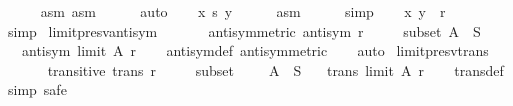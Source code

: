 \begin{isabellebody}
\ \ \ \ \isamarkupfalse%
\ asm{}\ asm{}\isanewline
\ \ \ \ \isamarkupfalse%
\ auto\isanewline
\ \ \isamarkupfalse%
\ {\isachardoublequoteopen}x\ {\isasympreceq}\isactrlsub {\isacharquery}{\kern0pt}s\ y{\isachardoublequoteclose}\isanewline
\ \ \ \ \isamarkupfalse%
\ asm{}\isanewline
\ \ \ \ \isamarkupfalse%
\ simp\isanewline
\ \ \isamarkupfalse%
\ {\isachardoublequoteopen}{\isacharparenleft}{\kern0pt}x{\isacharcomma}{\kern0pt}\ y{\isacharparenright}{\kern0pt}\ {\isasymin}\ r{\isachardoublequoteclose}\isanewline
\ \ \ \ \isamarkupfalse%
\ simp\isanewline
{}\isamarkupfalse%
%
\endisatagproof
{\isafoldproof}%
%
\isadelimproof
\isanewline
%
\endisadelimproof
\isanewline
{}\isamarkupfalse%
\ limit{\isacharunderscore}{\kern0pt}presv{\isacharunderscore}{\kern0pt}antisym{\isacharcolon}{\kern0pt}\isanewline
\ \ \isanewline
\ \ \ \ antisymmetric{\isacharcolon}{\kern0pt}\ {\isachardoublequoteopen}antisym\ r{\isachardoublequoteclose}\ \isanewline
\ \ \ \ subset{\isacharcolon}{\kern0pt}\ {\isachardoublequoteopen}A\ {\isasymsubseteq}\ S{\isachardoublequoteclose}\isanewline
\ \ \ {\isachardoublequoteopen}antisym\ {\isacharparenleft}{\kern0pt}limit\ A\ r{\isacharparenright}{\kern0pt}{\isachardoublequoteclose}\isanewline
%
\isadelimproof
\ \ %
\endisadelimproof
%
\isatagproof
{}\isamarkupfalse%
\ antisym{\isacharunderscore}{\kern0pt}def\ antisymmetric\isanewline
\ \ \isamarkupfalse%
\ auto%
\endisatagproof
{\isafoldproof}%
%
\isadelimproof
\isanewline
%
\endisadelimproof
\isanewline
{}\isamarkupfalse%
\ limit{\isacharunderscore}{\kern0pt}presv{\isacharunderscore}{\kern0pt}trans{\isacharcolon}{\kern0pt}\isanewline
\ \ \isanewline
\ \ \ \ transitive{\isacharcolon}{\kern0pt}\ {\isachardoublequoteopen}trans\ r{\isachardoublequoteclose}\ \isanewline
\ \ \ \ subset{\isacharcolon}{\kern0pt}\ \ \ \ \ {\isachardoublequoteopen}A\ {\isasymsubseteq}\ S{\isachardoublequoteclose}\isanewline
\ \ \ {\isachardoublequoteopen}trans\ {\isacharparenleft}{\kern0pt}limit\ A\ r{\isacharparenright}{\kern0pt}{\isachardoublequoteclose}\isanewline
%
\isadelimproof
\ \ %
\endisadelimproof
%
\isatagproof
{}\isamarkupfalse%
\ trans{\isacharunderscore}{\kern0pt}def\isanewline
{}\isamarkupfalse%
\ {\isacharparenleft}{\kern0pt}simp{\isacharcomma}{\kern0pt}\ safe{\isacharparenright}{\kern0pt}\isanewline

\end{isabellebody}
